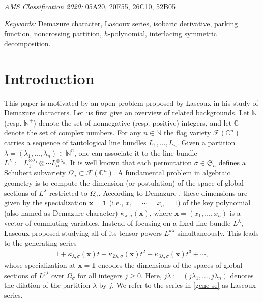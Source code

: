 \documentclass[12pt]{article}
\numberwithin{equation}{section}
\begin{document}
\noindent \emph{AMS Classification 2020:} 05A20, 20F55, 26C10, 52B05

\noindent \emph{Keywords:} Demazure character, Lascoux series, isobaric derivative, parking function, noncrossing partition, $h$-polynomial, interlacing symmetric decomposition.

\section{Introduction}\label{sec 1}
This paper is motivated by an open problem proposed by Lascoux \cite{Lascoux-2016} in his study of Demazure characters. Let us first give an overview of related backgrounds. 
Let $\mathbb{N}$ (resp. $\mathbb{N}^+$) denote the set of nonnegative (resp. positive) integers, and let $\mathbb{C}$ denote the set of complex numbers. For any $n\in \mathbb{N}$ the flag variety $\mathcal{F}(\mathbb{C}^n)$ carries a sequence of tautological line bundles $L_1, \ldots, L_n$. Given a partition $\lambda = (\lambda_1,\ldots,\lambda_n)\in\mathbb{N}^n$, one can associate it to the line bundle
$L^\lambda:=L_1^{\otimes \lambda_1}\otimes \cdots L_n^{\otimes \lambda_n}$. It is well known that each permutation $\sigma \in \mathfrak{S}_n$ defines a Schubert subvariety $\Omega_\sigma \subset \mathcal{F}(\mathbb{C}^n)$.
A fundamental problem in algebraic geometry is to compute the dimension (or postulation) of the space of global sections of $L^\lambda$ restricted to $\Omega_\sigma$.
According to Demazure \cite{Demazure-1974}, these dimensions are given by the specialization $\mathbf{x}=\mathbf{1}$ (i.e., $x_1=\cdots=x_n=1$) of the key polynomial (also named as Demazure character) $\kappa_{\lambda, \sigma}(\mathbf{x})$, where $\mathbf{x} = (x_1, \ldots, x_n)$ is a vector of commuting variables.
Instead of focusing on a fixed line bundle $L^\lambda$, Lascoux \cite{Lascoux-2016} proposed studying all of its tensor powers $L^{k\lambda}$ simultaneously. This leads to the generating  series
\begin{align}\label{gene se}
1+\kappa_{\lambda, \sigma}(\textbf{x})t
+\kappa_{2\lambda, \sigma}(\textbf{x})t^2
+\kappa_{3\lambda, \sigma}(\textbf{x})t^3+\cdots,
\end{align}
whose specialization at $\mathbf{x}=\mathbf{1}$ encodes the dimensions of the spaces of global sections of $L^{j\lambda}$ over $\Omega_\sigma$ for all integers $j \geq 0$. Here, $j\lambda := (j\lambda_1, \ldots, j\lambda_n)$ denotes the dilation of the partition $\lambda$ by $j$. We refer to the series in \eqref{gene se} as Lascoux series. 
\end{document}
